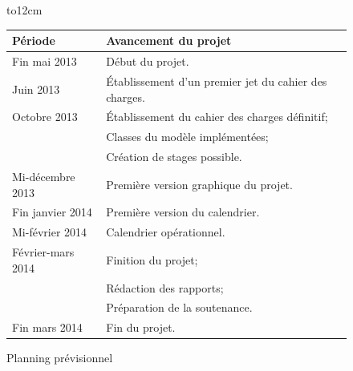 \documentclass[a4paper,10pt]{report}
\begin{document}
    ~\\~\\
    \begin{figure}[H]
	\hbox to12cm{\hss
	\begin{tabular}{|l|l|}
	    \hline
	      \textbf{Période} &  \textbf{Avancement du projet}\\
	    \hline
	      Fin mai 2013 & Début du projet.\\
	    \hline
	      Juin 2013 & Établissement d'un premier jet du cahier des charges.\\
	    \hline
	      Octobre 2013 & Établissement du cahier des charges définitif;\\
			  & Classes du modèle implémentées;\\
			  & Création de stages possible.\\
	    \hline
	      Mi-décembre 2013 & Première version graphique du projet.\\
	    \hline
	      Fin janvier 2014 & Première version du calendrier.\\
	    \hline	
	      Mi-février 2014 & Calendrier opérationnel.\\
	    \hline
	      Février-mars 2014 & Finition du projet;\\
				& Rédaction des rapports;\\
				& Préparation de la soutenance.\\
	    \hline
	      Fin mars 2014 & Fin du projet.\\
	    \hline
	\end{tabular}  
      \hss}
      \caption{Planning prévisionnel}
    \end{figure}
      
     
      
\end{document}
